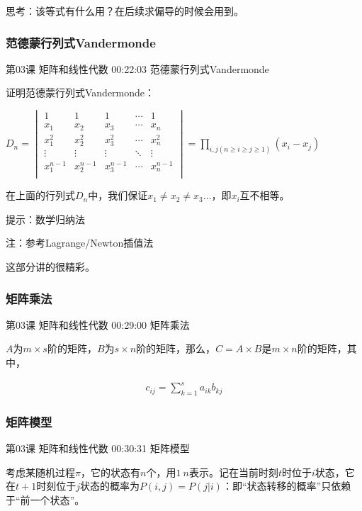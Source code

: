 \documentclass[UTF8]{ctexart}
\begin{document}
思考：该等式有什么用？在后续求偏导的时候会用到。

\subsubsection{范德蒙行列式Vandermonde}

第03课 矩阵和线性代数 00:22:03 范德蒙行列式Vandermonde

证明范德蒙行列式Vandermonde：

$D_{n}=
\begin{vmatrix}
1 & 1 & 1 & \cdots & 1 \\
x_{1} & x_{2} & x_{3}  & \cdots & x_{n} \\
x_{1}^{2} & x_{2}^{2} & x_{3}^{2}  & \cdots & x_{n}^{2} \\
\vdots & \vdots & \vdots  & \ddots & \vdots \\
x_{1}^{n-1} & x_{2}^{n-1} & x_{3}^{n-1}  & \cdots & x_{n}^{n-1} \\
\end{vmatrix}
=\underset{i,j(n \geq i \geq j \geq 1)}{\prod }(x_{i}-x_{j})$ \quad

在上面的行列式$D_{n}$中，我们保证$x_{1} \neq x_{2} \neq x_{3} \dots$，即$x_{i}$互不相等。

提示：数学归纳法

注：参考Lagrange/Newton插值法

这部分讲的很精彩。




\subsubsection{矩阵乘法}

第03课 矩阵和线性代数 00:29:00 矩阵乘法

$A$为$m \times s$阶的矩阵，$B$为$s \times n$阶的矩阵，那么，$C=A \times B$是$m \times n$阶的矩阵，其中，

\begin{equation}
\begin{aligned}
c_{ij}=\sum_{k=1}^{s}a_{ik}b_{kj}
\end{aligned}
\end{equation}

\subsubsection{矩阵模型}

第03课 矩阵和线性代数 00:30:31 矩阵模型

考虑某随机过程$\pi$，它的状态有$n$个，用$1~n$表示。记在当前时刻$t$时位于$i$状态，它在$t+1$时刻位于$j$状态的概率为$P(i,j)=P(j|i)$：即“状态转移的概率”只依赖于“前一个状态”。\\
\end{document}
